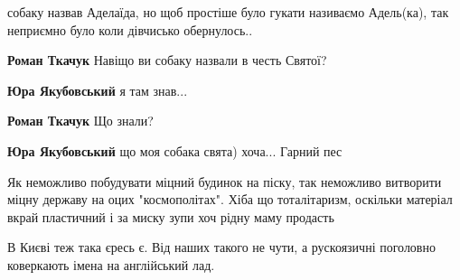 \begin{itemize}
собаку назвав Аделаїда, но щоб простіше було гукати називаємо Адель(ка), так
неприємно було коли дівчисько обернулось..

\begin{itemize}
 
\textbf{Роман Ткачук} Навіщо ви собаку назвали в честь Святої?

 
\textbf{Юра Якубовський} я там знав...

 
\textbf{Роман Ткачук} Що знали?

 
\textbf{Юра Якубовський} що моя собака свята) хоча... Гарний пес
\end{itemize}


Як неможливо побудувати міцний будинок на піску, так неможливо витворити міцну
державу на оцих "космополітах". Хіба що тоталітаризм, оскільки матеріал вкрай
пластичний і за миску зупи хоч рідну маму продасть

 

В Києві теж така єресь є. Від наших такого не чути, а рускоязичні поголовно
коверкають імена на англійський лад.


\end{itemize}
